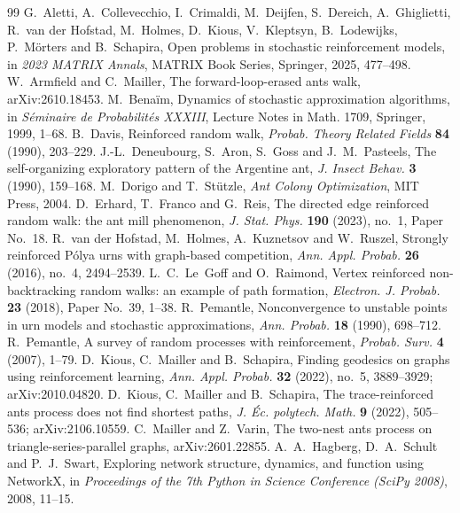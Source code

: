 \documentclass[11pt]{amsart}
\theoremstyle{remark}
\begin{document}
\begin{thebibliography}{99}
 G.~Aletti, A.~Collevecchio, I.~Crimaldi, M.~Deijfen, S.~Dereich, A.~Ghiglietti, R.~van der Hofstad,
M.~Holmes, D.~Kious, V.~Kleptsyn, B.~Lodewijks, P.~M\"orters and B.~Schapira, Open problems in stochastic
reinforcement models, in \emph{2023 MATRIX Annals}, MATRIX Book Series, Springer, 2025, 477--498.
 W.~Armfield and C.~Mailler, The forward-loop-erased ants walk, arXiv:2610.18453.
 M.~Bena\"im, Dynamics of stochastic approximation algorithms, in \emph{S\'eminaire de Probabilit\'es
XXXIII}, Lecture Notes in Math. 1709, Springer, 1999, 1--68.
 B.~Davis, Reinforced random walk, \emph{Probab. Theory Related Fields} \textbf{84} (1990), 203--229.
 J.-L.~Deneubourg, S.~Aron, S.~Goss and J.~M.~Pasteels, The self-organizing exploratory pattern of the
Argentine ant, \emph{J. Insect Behav.} \textbf{3} (1990), 159--168.
 M.~Dorigo and T.~St\"utzle, \emph{Ant Colony Optimization}, MIT Press, 2004.
 D.~Erhard, T.~Franco and G.~Reis, The directed edge reinforced random walk: the ant mill phenomenon,
\emph{J. Stat. Phys.} \textbf{190} (2023), no.~1, Paper No.~18.
 R.~van der Hofstad, M.~Holmes, A.~Kuznetsov and W.~Ruszel, Strongly reinforced P\'olya urns with
graph-based competition, \emph{Ann. Appl. Probab.} \textbf{26} (2016), no.~4, 2494--2539.
 L.~C.~Le~Goff and O.~Raimond, Vertex reinforced non-backtracking random walks: an example of path
formation, \emph{Electron. J. Probab.} \textbf{23} (2018), Paper No.~39, 1--38.
 R.~Pemantle, Nonconvergence to unstable points in urn models and stochastic approximations,
\emph{Ann. Probab.} \textbf{18} (1990), 698--712.
 R.~Pemantle, A survey of random processes with reinforcement, \emph{Probab. Surv.} \textbf{4}
(2007), 1--79.
 D.~Kious, C.~Mailler and B.~Schapira, Finding geodesics on graphs using reinforcement learning,
\emph{Ann. Appl. Probab.} \textbf{32} (2022), no.~5, 3889--3929; arXiv:2010.04820.
 D.~Kious, C.~Mailler and B.~Schapira, The trace-reinforced ants process does not find shortest paths,
\emph{J. \'Ec. polytech. Math.} \textbf{9} (2022), 505--536; arXiv:2106.10559.
 C.~Mailler and Z.~Varin, The two-nest ants process on triangle-series-parallel graphs,
arXiv:2601.22855.
 A.~A.~Hagberg, D.~A.~Schult and P.~J.~Swart, Exploring network structure, dynamics, and function
using NetworkX, in \emph{Proceedings of the 7th Python in Science Conference (SciPy 2008)}, 2008, 11--15.

\end{thebibliography}
\end{document}

